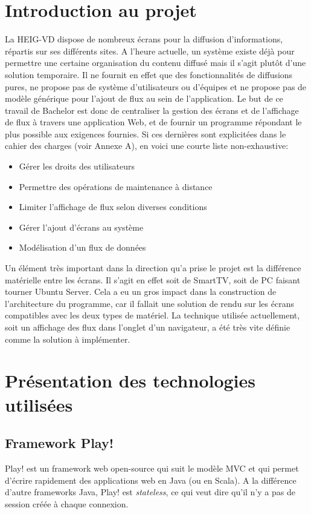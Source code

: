 \documentclass[french]{article}
\begin{document}
\newpage

\section{Introduction au projet}

La HEIG-VD dispose de nombreux écrans pour la diffusion d'informations, répartis sur ses différents sites. A l'heure actuelle, un système existe déjà pour permettre une certaine organisation du contenu diffusé mais il s'agit plutôt d'une solution temporaire. Il ne fournit en effet que des fonctionnalités de diffusions pures, ne propose pas de système d'utilisateurs ou d'équipes et ne propose pas de modèle générique pour l'ajout de flux au sein de l'application. \newline
Le but de ce travail de Bachelor est donc de centraliser la gestion des écrans et de l'affichage de flux à travers une application Web, et de fournir un programme répondant le plus possible aux exigences fournies. Si ces dernières sont explicitées dans le cahier des charges (voir Annexe A), en voici une courte liste non-exhaustive:
\begin{itemize}
	\item Gérer les droits des utilisateurs
	\item Permettre des opérations de maintenance à distance
	\item Limiter l'affichage de flux selon diverses conditions
	\item Gérer l'ajout d'écrans au système 
	\item Modélisation d'un flux de données \newline
\end{itemize}

Un élément très important dans la direction qu'a prise le projet est la différence matérielle entre les écrans. Il s'agit en effet soit de SmartTV, soit de PC faisant tourner Ubuntu Server. Cela a eu un gros impact dans la construction de l'architecture du programme, car il fallait une solution de rendu sur les écrans compatibles avec les deux types de matériel. La technique utilisée actuellement, soit un affichage des flux dans l'onglet d'un navigateur, a été très vite définie comme la solution à implémenter.


\newpage
\section{Présentation des technologies utilisées}

\subsection{Framework Play!}
Play! est un framework web open-source qui suit le modèle MVC et qui permet d'écrire rapidement des applications web en Java (ou en Scala). A la différence d'autre frameworks Java, Play! est \textit{stateless}, ce qui veut dire qu'il n'y a pas de session créée à chaque connexion. 
\end{document}
